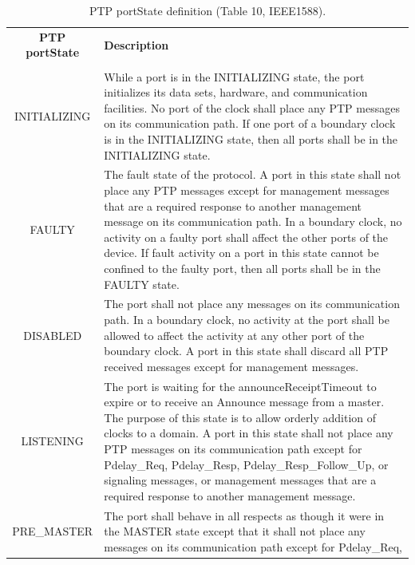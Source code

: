 \documentclass[a4paper, 12pt]{article}
\begin{document}
 \newpage



\begin{table}[hp!]
\caption{PTP portState definition (Table 10, IEEE1588).}
\centering
\begin{tabular}{| c | p{9.5cm} |}          \hline
\textbf{PTP portState}  &  \textbf{Description} \\ 
&   \\ \hline
\small
INITIALIZING       &  \small While a port is in the INITIALIZING state, the port initializes its 
		      data sets, hardware, and
		      communication facilities. No port of the clock shall place any PTP messages
		      on its
		      communication path. If one port of a boundary clock is in the INITIALIZING 
		      state, then all ports
		      shall be in the INITIALIZING state.  \\ \hline
FAULTY             &  \small The fault state of the protocol. A port in this state shall not place 
		      any PTP messages except for
		      management messages that are a required response to another management 
		      message on its
		      communication path. In a boundary clock, no activity on a faulty port  
		      shall affect the other ports
		      of the device. If fault activity on a port in this state cannot be confined 
		      to the faulty port, then all
		      ports shall be in the FAULTY state. \\ \hline
DISABLED           &  \small The port shall not place any messages on its communication path. In a
		      boundary clock, no
		      activity at the port shall be allowed to affect the activity at any other
		      port of the boundary clock.
		      A port in this state shall discard all PTP received messages except for 
		      management messages. \\ \hline
LISTENING          &  \small The port is waiting for the announceReceiptTimeout to expire or to
		      receive an Announce
		      message from a master. The purpose of this state is to allow orderly addition 
		      of clocks to a
		      domain. A port in this state shall not place any PTP messages on its 
		      communication path except
		      for Pdelay\_Req, Pdelay\_Resp, Pdelay\_Resp\_Follow\_Up, or signaling 
		      messages, or management
		      messages that are a required response to another management message. \\ \hline
PRE\_MASTER         & \small The port shall behave in all respects as though it were in the 
		      MASTER state except that it shall
		      not place any messages on its communication path except for Pdelay\_Req, 

\end{tabular}
\end{table}
\end{document}

